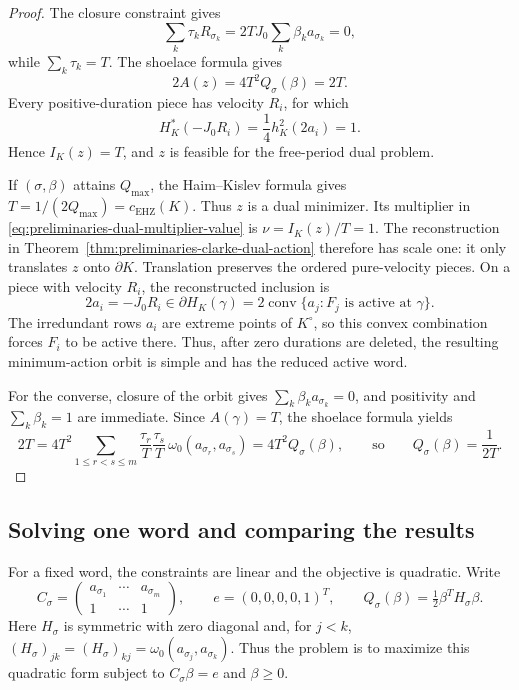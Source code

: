 \begin{proof}
The closure constraint gives
\[
  \sum_k\tau_kR_{\sigma_k}
  =2T J_0\sum_k\beta_k a_{\sigma_k}
  =0,
\]
while \(\sum_k\tau_k=T\).  The shoelace formula gives
\[
  2A(z)
  =4T^2Q_\sigma(\beta)
  =2T.
\]
Every positive-duration piece has velocity \(R_i\), for which
\[
  H_K^*(-J_0R_i)=\frac14h_K^2(2a_i)=1.
\]
Hence \(I_K(z)=T\), and \(z\) is feasible for the free-period dual problem.

If \((\sigma,\beta)\) attains \(Q_{\max}\), the Haim--Kislev formula gives
\(T=1/(2Q_{\max})=c_{\mathrm{EHZ}}(K)\).  Thus \(z\) is a dual minimizer.
Its multiplier in \eqref{eq:preliminaries-dual-multiplier-value} is
\(\nu=I_K(z)/T=1\).  The reconstruction in
Theorem~\ref{thm:preliminaries-clarke-dual-action} therefore has scale one:
it only translates \(z\) onto \(\partial K\).  Translation preserves the
ordered pure-velocity pieces. On a piece with velocity \(R_i\), the
reconstructed inclusion is
\[
  2a_i=-J_0R_i\in\partial H_K(\gamma)
  =2\operatorname{conv}\{a_j:F_j\text{ is active at }\gamma\}.
\]
The irredundant rows \(a_i\) are extreme points of \(K^\circ\), so this convex
combination forces \(F_i\) to be active there. Thus, after zero durations are
deleted, the resulting minimum-action orbit is simple and has the reduced
active word.

For the converse, closure of the orbit gives
\(\sum_k\beta_k a_{\sigma_k}=0\), and positivity and
\(\sum_k\beta_k=1\) are immediate.  Since \(A(\gamma)=T\), the shoelace
formula yields
\[
  2T
  =
  4T^2
  \sum_{1\leq r<s\leq m}
    \frac{\tau_r}{T}\frac{\tau_s}{T}\,
    \omega_0(a_{\sigma_r},a_{\sigma_s})
  =
  4T^2Q_\sigma(\beta),
  \qquad\text{so}\qquad
  Q_\sigma(\beta)=\frac{1}{2T}.
\]
\end{proof}

\subsection{Solving one word and comparing the results}
\label{subsec:quadratic-program-algorithm-hk2019-computation-layers}

For a fixed word, the constraints are linear and the objective is quadratic.
Write
\[
 C_\sigma=
 \begin{pmatrix}
 a_{\sigma_1}&\cdots&a_{\sigma_m}\\1&\cdots&1
 \end{pmatrix},\qquad e=(0,0,0,0,1)^T,\qquad
 Q_\sigma(\beta)=\tfrac12\beta^T H_\sigma\beta.
\]
Here $H_\sigma$ is symmetric with zero diagonal and, for $j<k$,
$(H_\sigma)_{jk}=(H_\sigma)_{kj}=\omega_0(a_{\sigma_j},a_{\sigma_k})$.
Thus the problem is to maximize this quadratic form subject to
$C_\sigma\beta=e$ and $\beta\geq0$.

